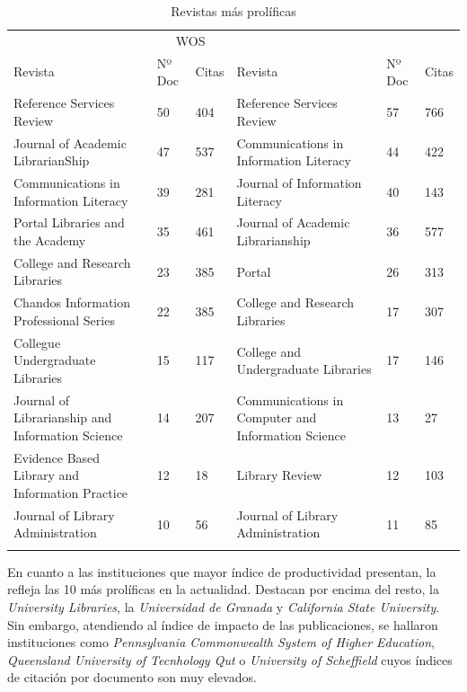 \documentclass[spanish]{textolivre}
\begin{document}
\begin{table}[h]
\caption{Revistas más prolíficas}
\label{tab2}
\centering
\scriptsize
\begin{tabular}{%
    >{\raggedright\arraybackslash}p{}%
    p{}%
    p{}%
    >{\raggedright\arraybackslash}p{}%
    p{}%
    p{}}
\toprule 
& \multicolumn{2}{c}{WOS} & & \multicolumn{2}{c}{Scopus}
\\
Revista	& Nº Doc & Citas & Revista & Nº Doc & Citas
\\
\midrule
\arrayrulecolor[gray]{.7}
Reference Services Review & 50 & 404 & Reference Services Review & 57 & 766
\\
Journal of Academic LibrarianShip & 47 & 537 & Communications in Information Literacy & 44 & 422
\\
Communications in Information Literacy & 39 & 281 & Journal of Information Literacy & 40 & 143
\\
Portal Libraries and the Academy & 35 & 461 & Journal of Academic Librarianship & 36 & 577
\\
College and Research Libraries & 23 & 385 & Portal & 26 & 313
\\
Chandos Information Professional Series & 22 & 385 & College and Research Libraries & 17 & 307
\\
Collegue Undergraduate Libraries & 15 & 117 & College and Undergraduate Libraries & 17 & 146
\\
Journal of Librarianship and Information Science & 14 & 207 & Communications in Computer and Information Science & 13 & 27
\\
Evidence Based Library and Information Practice & 12 & 18 & Library Review & 12 & 103
\\
Journal of Library Administration & 10 & 56 & Journal of Library Administration & 11 & 85
\\
\arrayrulecolor{black}
\bottomrule
\end{tabular}
\centering
{}
\end{table}

En cuanto a las instituciones que mayor índice de productividad presentan, la  refleja las 10 más prolíficas en la actualidad. Destacan por encima del resto, la \emph{University Libraries}, la \emph{Universidad de Granada} y \emph{California State University}. Sin embargo, atendiendo al índice de impacto de las publicaciones, se hallaron instituciones como \emph{Pennsylvania Commonwealth System of Higher Education}, \emph{Queensland University of Tecnhology Qut} o \emph{University of Scheffield}  cuyos índices de citación por documento son muy elevados.
\end{document}
